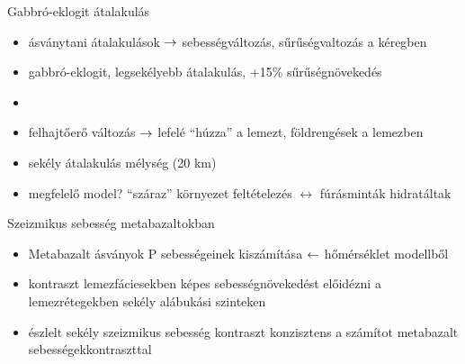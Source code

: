 \begin{frame}{Gabbró-eklogit átalakulás}
    \begin{itemize}
        \item ásványtani átalakulások $\rightarrow$ sebességváltozás, sűrűségvaltozás a kéregben
        \item gabbró-eklogit, legsekélyebb átalakulás, +15\% sűrűségnövekedés
        \item {}
        \item felhajtőerő változás $\rightarrow$ lefelé ``húzza'' a lemezt, földrengések a lemezben
        \item sekély átalakulás mélység (20 km)
        \item megfelelő model? ``száraz'' környezet feltételezés $\leftrightarrow$ fúrásminták hidratáltak
    \end{itemize}
\end{frame}


\begin{frame}{Szeizmikus sebesség metabazaltokban}
    \begin{minipage}[c]{0.525\textwidth}
        \centering
    \end{minipage}
    \hspace{10pt}
    \begin{minipage}[c]{0.4\textwidth}
        \begin{itemize}
            \item Metabazalt ásványok P sebességeinek kiszámítása $\leftarrow$ hőmérséklet modellből
            \item kontraszt lemezfáciesekben képes sebességnövekedést előidézni a lemezrétegekben sekély alábukási szinteken
            \item észlelt sekély szeizmikus sebesség kontraszt konzisztens a számítot metabazalt sebességekkontraszttal
        \end{itemize}    
    \end{minipage}
\end{frame}
